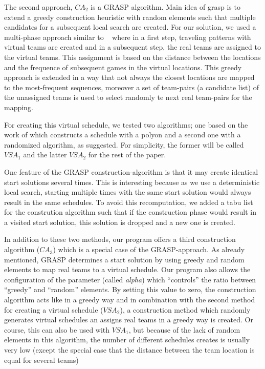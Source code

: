 \documentclass[a4paper,11pt]{article}
\begin{document}
The second approach, $CA_2$ is a \ac{GRASP} algorithm. Main idea of grasp is to extend a greedy construction heuristic with random elements such that multiple candidates for a subsequent local search are created.
For our solution, we used a multi-phase approach similar to ~\cite{Ribeiro04heuristicsfor} where in a first step, traveling patterns with virtual 
teams are created and in a subsequent step, the real teams are assigned to the virtual teams.
This assignment is based on the distance between the locations and the frequence of subsequent games in the virtual locations. 
This greedy approach is extended in a way that not always the closest locations are mapped to the most-frequent sequences, moreover a set of team-pairs (a candidate list) of the unassigned teams 
is used to select randomly te next real team-pairs for the mapping.

For creating this virtual schedule, we tested two algorithms; one based on the work of \cite{Gaspero07} which constructs a schedule with a polyon and a second one
with a randomized algorithm, as \cite{Anagnostopoulos06} suggested. For simplicity, the former will be called $VSA_1$ and the latter $VSA_2$ for the rest of the paper.

One feature of the GRASP construction-algorithm is that it may create identical start solutions several times. 
This is interesting because as we use a deterministic local search, starting multiple times with the same start solution would always result in the same schedules.
To avoid this recomputation, we added a tabu list for the constrution algorithm such that if the construction phase would result in a visited start solution, this solution is dropped and a new one is created.

In addition to these two methods, our program offers a third construction algorithm ($CA_3$) which is a special case of the \ac{GRASP}-approach. As already mentioned, \ac{GRASP} determines a start solution
 by using greedy and random elements to map real teams to a virtual schedule. Our program also allows the configuration of the parameter (called \emph{alpha}) 
which ``controls'' the ratio between ``greedy'' and ``random'' elements. By setting this value to zero, the construction algorithm acts like in a greedy way and in combination with the second 
method for creating a virtual schedule ($VSA_2$), a construction method which randomly generates virtual schedules an assigns real teams in a greedy way is created.
Or course, this can also be used with $VSA_1$, but because of the lack of random elements in this algorithm, the number of different schedules creates is usually very low (except the special case that the 
distance between the team location is equal for several teams)
\end{document}
